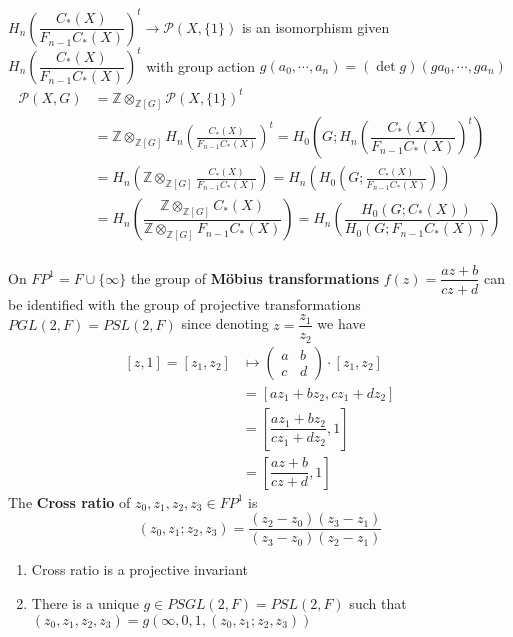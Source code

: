 \documentclass[../main.tex]{subfiles}
\begin{document}
\begin{theorem}
$H_n\left(\dfrac{C_*(X)}{F_{n-1}C_*(X)}\right)^t\to\mathcal P(X,\{1\})$ is an isomorphism given $H_n\left(\dfrac{C_*(X)}{F_{n-1}C_*(X)}\right)^t$ with group action $g(a_0,\cdots,a_n)=(\det g)(ga_0,\cdots,ga_n)$
\begin{align*}
\mathcal P(X,G)&=\mathbb Z\otimes_{\mathbb Z[G]}\mathcal P(X,\{1\})^t \\
&=\mathbb Z\otimes_{\mathbb Z[G]}H_n\left(\frac{C_*(X)}{F_{n-1}C_*(X)}\right)^t=H_0\left(G;H_n\left(\dfrac{C_*(X)}{F_{n-1}C_*(X)}\right)^t\right) \\
&= H_n\left(\mathbb Z\otimes_{\mathbb Z[G]}\frac{C_*(X)}{F_{n-1}C_*(X)}\right)= H_n\left(H_0\left(G;\frac{C_*(X)}{F_{n-1}C_*(X)}\right)\right) \\
&= H_n\left(\dfrac{\mathbb Z\otimes_{\mathbb Z[G]}C_*(X)}{\mathbb Z\otimes_{\mathbb Z[G]}F_{n-1}C_*(X)}\right)= H_n\left(\dfrac{H_0(G;C_*(X))}{H_0(G;F_{n-1}C_*(X))}\right) \\
\end{align*}
\end{theorem}

\begin{definition}
On $FP^1=F\cup\{\infty\}$ the group of \textbf{M\"obius transformations} $f(z)=\dfrac{az+b}{cz+d}$ can be identified with the group of projective transformations $PGL(2,F)=PSL(2,F)$ since denoting $z=\dfrac{z_1}{z_2}$ we have
\begin{align*}
\left[z,1\right]=[z_1,z_2]&\mapsto\begin{pmatrix}
a&b\\
c&d
\end{pmatrix}\cdot[z_1,z_2] \\
&=[az_1+bz_2,cz_1+dz_2] \\
&=\left[\dfrac{az_1+bz_2}{cz_1+dz_2},1\right] \\
&=\left[\dfrac{az+b}{cz+d},1\right]
\end{align*}
The \textbf{Cross ratio} of $z_0,z_1,z_2,z_3\in FP^1$ is
\[(z_0,z_1;z_2,z_3)=\dfrac{(z_2-z_0)(z_3-z_1)}{(z_3-z_0)(z_2-z_1)}\]
\end{definition}

\begin{lemma} \hfill
\begin{enumerate}[label=\textbf{\arabic*.}, leftmargin=*]
\item Cross ratio is a projective invariant
\item There is a unique $g\in PSGL(2,F)=PSL(2,F)$ such that $(z_0,z_1,z_2,z_3)=g(\infty,0,1,(z_0,z_1;z_2,z_3))$
\end{enumerate}
\end{lemma}
\end{document}
